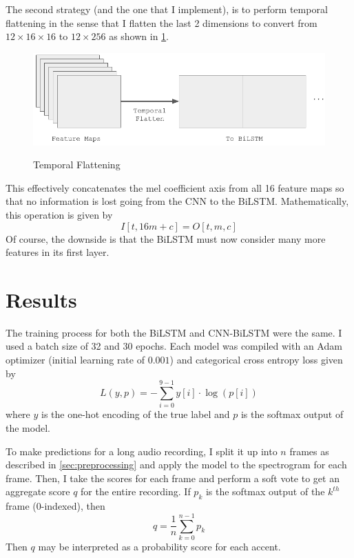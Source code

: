 \documentclass[11pt,a4paper]{article}
\begin{document}
The second strategy (and the one that I implement), is to perform temporal flattening in the sense that I flatten the last 2 dimensions to convert from \(12 \times 16 \times 16\) to \(12 \times 256\) as shown in \cref{fig:temp_flatten}.
\begin{figure}[h]
  \centering
  \caption{Temporal Flattening}
  \includegraphics[width=.48\textwidth]{temp_flatten.png}
  \label{fig:temp_flatten}
\end{figure}
This effectively concatenates the mel coefficient axis from all 16 feature maps so that no information is lost going from the CNN to the BiLSTM. Mathematically, this operation is given by
\begin{equation}
  I[t, 16m + c] = O[t, m, c]
\end{equation}
Of course, the downside is that the BiLSTM must now consider many more features in its first layer.

\section{Results} \label{sec:results}

The training process for both the BiLSTM and CNN-BiLSTM were the same. I used a batch size of 32 and 30 epochs. Each model was compiled with an Adam optimizer (initial learning rate of \(0.001\)) and categorical cross entropy loss given by
\begin{equation}
  L(y, p) = -\sum_{i = 0}^{9 - 1} y[i] \cdot \log(p[i])
\end{equation}
where \(y\) is the one-hot encoding of the true label and \(p\) is the softmax output of the model.

To make predictions for a long audio recording, I split it up into \(n\) frames as described in \cref{sec:preprocessing} and apply the model to the spectrogram for each frame. Then, I take the scores for each frame and perform a soft vote to get an aggregate score \(q\) for the entire recording. If \(p_k\) is the softmax output of the \(k^{th}\) frame (0-indexed), then
\begin{equation}
  q = \frac{1}{n} \sum_{k = 0}^{n - 1} p_k
\end{equation}
Then \(q\) may be interpreted as a probability score for each accent.
\end{document}
